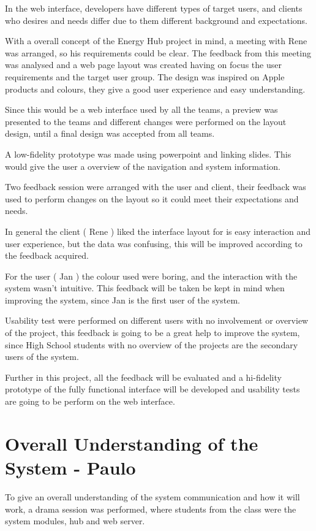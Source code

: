 In the web interface, developers have different types of target users, and clients who desires and needs differ due to them different background and expectations. 

With a overall concept of the Energy Hub project in mind, a meeting with Rene was arranged, so his requirements could be clear. The feedback from this meeting was analysed and a web page layout was created having on focus the user requirements and the target user group. The design was inspired on Apple products and colours, they give a good user experience and easy understanding.

Since this would be a web interface used by all the teams, a preview was presented to the teams and different changes were performed on the layout design, until a final design was accepted from all teams. 

A low-fidelity prototype was made using powerpoint and linking slides. This would give the user a overview of the navigation and system information.

Two feedback session were arranged with the user and client, their feedback was used to perform changes on the layout so it could meet their expectations and needs.

In general the client ( Rene ) liked the interface layout for is easy interaction and user experience, but the data was confusing, this will be improved according to the feedback acquired.

For the user ( Jan ) the colour used were boring, and the interaction with the system wasn't intuitive. This feedback will be taken be kept in mind when improving the system, since Jan is the first user of the system.

Usability test were performed on different users with no involvement or overview of the project, this feedback is going to be a great help to improve the system, since High School students with no overview of the projects are the secondary users of the system.

Further in this project, all the feedback will be evaluated and a hi-fidelity prototype of the fully functional interface will be developed and usability tests are going to be perform on the web interface.

\section{Overall Understanding of the System - Paulo} 

To give an overall understanding of the system communication and how it will work, a drama session was performed, where students from the class were the system modules, hub and web server.

